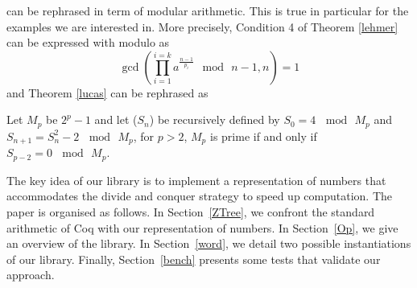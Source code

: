 can be rephrased in term of modular arithmetic. This is true in particular for the examples we are
interested in. More precisely, Condition 4 of Theorem \ref{lehmer} can be expressed with modulo as
$$
\gcd(\prod_{i=1}^{i=k}a^{\frac{n-1}{p_i}} \mod\, n -1,n) = 1
$$
and Theorem \ref{lucas} can be rephrased as
\begin{theorem}
Let $M_p$ be $2^p-1$ and let  ($S_n$) be recursively defined by $S_0= 4\, \mod\, M_p$ and $S_{n+1} = S_n^2 - 2\, \mod\, M_p$,
for $p > 2$, $M_p$ is prime if and only if $S_{p-2} = 0\, \mod\, M_p $.
\end{theorem}
The key idea of our library is to implement a representation of numbers that accommodates the divide and
conquer strategy to speed up computation. The paper is organised as follows. 
In Section~\ref{ZTree}, we confront the standard arithmetic of {\sc Coq} with
our representation of numbers. In Section~\ref{Op}, we give an overview of the library.  
In Section~\ref{word}, we detail two possible instantiations of our library.
Finally, Section~\ref{bench} presents some tests that validate our approach.
 
